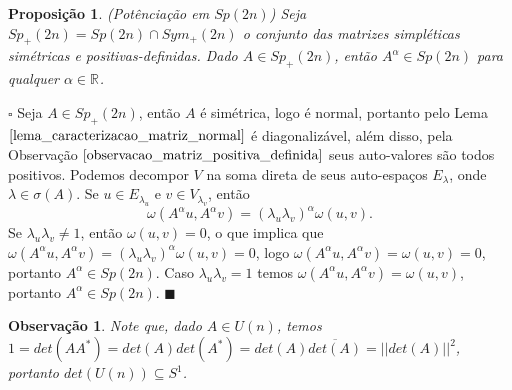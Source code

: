 \documentclass[12pt]{book}
\newtheorem{observacao}[teorema]{Observação}
\newtheorem{proposicao}[teorema]{Proposição}
\newenvironment{prova}[1]{$\square$ #1}{\hfill$\blacksquare$}
\newcommand{\espectrooperador}[1]{\sigma(#1)}
\newcommand{\gruposimpletico}[1]{Sp(#1)}
\newcommand{\gruposimpleticopositivo}[1]{Sp_{+}(#1)}
\newcommand{\matrizsimetricapositiva}[1]{Sym_{+}(#1)}
\newcommand{\matrizunitaria}[1]{U(#1)}
\newcommand{\real}[1]{\mathbb{R}^{#1}}
\begin{document}
	\begin{proposicao}\label{proposicao_potenciacao_grupo_simpletico}
		(Potênciação em $\gruposimpletico{2n}$) Seja $\gruposimpleticopositivo{2n} = \gruposimpletico{2n} \cap \matrizsimetricapositiva{2n}$ o conjunto das matrizes simpléticas simétricas e positivas-definidas. Dado $A \in \gruposimpleticopositivo{2n}$, então $A^{\alpha} \in \gruposimpletico{2n}$ para qualquer $\alpha \in \real{}$.
	\end{proposicao}
	\begin{prova}
		Seja $A \in \gruposimpleticopositivo{2n}$, então $A$ é simétrica, logo é normal, portanto pelo Lema $\ref{lema_caracterizacao_matriz_normal}$ é diagonalizável, além disso, pela Observação $\ref{observacao_matriz_positiva_definida}$ seus auto-valores são todos positivos. Podemos decompor $V$ na soma direta de seus auto-espaços $E_{\lambda}$, onde $\lambda \in \espectrooperador{A}$. Se $u \in E_{\lambda_{u}}$ e $v \in V_{\lambda_{v}}$, então
		$$
		\omega(A^{\alpha}u,A^{\alpha}v) = 		(\lambda_{u}\lambda_{v})^{\alpha}\omega(u,v).
		$$
		Se $\lambda_{u}\lambda_{v}\neq 1$, então $\omega(u,v)=0$, o que implica que $\omega(A^{\alpha}u,A^{\alpha}v)=(\lambda_{u}\lambda_{v})^{\alpha}\omega(u,v)=0$, logo $\omega(A^{\alpha}u,A^{\alpha}v) = \omega(u,v)=0$, portanto $A^{\alpha} \in \gruposimpletico{2n}$. Caso $\lambda_{u}\lambda_{v}=1$ temos $\omega(A^{\alpha}u,A^{\alpha}v) = \omega(u,v)$, portanto $A^{\alpha} \in \gruposimpletico{2n}$.
	\end{prova}
	
	\begin{observacao}\label{observacao_determinante_matriz_unitaria}
		Note que, dado $A \in \matrizunitaria{n}$, temos $1= det(AA^{*}) = det(A)det(A^{*}) = det(A)\overline{det(A)} = ||det(A)||^{2}$, portanto $det(\matrizunitaria{n}) \subseteq S^{1}$.
	\end{observacao}
	
\end{document}
